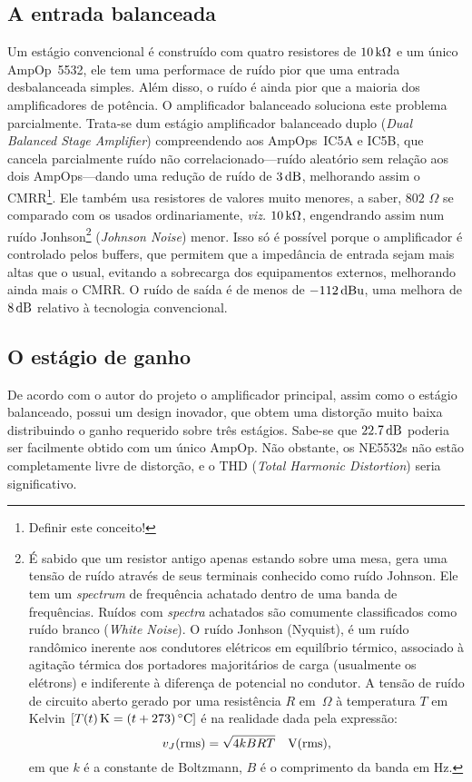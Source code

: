\documentclass[12pt, a4paper, leqno, twoside]{book}
\def\ohm{\,\Omega}
\def\ampop{AmpOp}
\def\db{{\rm dB}}
\begin{document}
  \subsection{A entrada balanceada}
  Um est\'agio convencional \'e constru\'ido com quatro resistores de $10\,{\rm k}\Omega$ e um \'unico \ampop\ 5532, ele tem uma performace de ru\'ido pior que uma entrada desbalanceada simples. Al\'em disso, o ru\'ido \'e ainda pior que a maioria dos amplificadores de pot\^encia. O amplificador balanceado soluciona este problema parcialmente. Trata-se dum est\'agio amplificador balanceado duplo ({\it Dual Balanced Stage Amplifier}) compreendendo aos \ampop{s}\ IC5A e IC5B, que cancela parcialmente ru\'ido n\~ao correlacionado---ru\'ido aleat\'orio sem rela\c c\~ao aos dois \ampop{s}---dando uma redu\c c\~ao de ru\'ido de $3\,\db$, melhorando assim o CMRR\footnote{Definir este conceito!}. Ele tamb\'em usa resistores de valores muito menores, a saber, $802\,\ohm$ se comparado com os usados ordinariamente, {\it viz.} $10\,{\rm k}\Omega$, engendrando assim num ru\'ido Jonhson\footnote{\'E sabido que um resistor antigo apenas estando sobre uma mesa, gera uma tens\~ao de ru\'ido atrav\'es de seus terminais conhecido como ru\'ido Johnson. Ele tem um {\it spectrum} de frequ\^encia achatado dentro de uma banda de frequ\^encias. Ru\'idos com {\it spectra} achatados s\~ao comumente classificados como ru\'ido branco ({\it White Noise}\/). O ru\'ido Jonhson (Nyquist), \'e um ru\'ido rand\^omico inerente aos condutores el\'etricos em equil\'ibrio t\'ermico, associado \`a agita\c c\~ao t\'ermica dos portadores majorit\'arios de carga (usualmente os el\'etrons) e indiferente \`a diferen\c ca de potencial no condutor. A tens\~ao de ru\'ido de circuito aberto gerado por uma resist\^encia $R$ em $\ohm$ \`a temperatura $T$ em Kelvin $[T(t)\,{\rm K}=(t+273)\,^\circ{\rm C}]$ \'e na realidade dada pela express\~ao:
    $$
      v_{J}({\rm rms})=\sqrt{4kBRT}\quad{\rm V(rms)},
    $$
    em que $k$ \'e a constante de Boltzmann, $B$ \'e o comprimento da banda em Hz.
  } ({\it Johnson Noise}) menor. Isso s\'o \'e poss\'ivel porque o amplificador \'e controlado pelos buffers, que permitem que a imped\^ancia de entrada sejam mais altas que o usual, evitando a sobrecarga dos equipamentos externos, melhorando ainda mais o CMRR. O ru\'ido de sa\'ida \'e de menos de $-112\,\db{\rm u}$, uma melhora de $8\,\db$ relativo \`a tecnologia convencional.
  \subsection{O est\'agio de ganho}
  De acordo com o autor do projeto o amplificador principal, assim como o est\'agio balanceado, possui um design inovador, que obtem uma distor\c c\~ao muito baixa distribuindo o ganho requerido sobre tr\^es est\'agios. Sabe-se que $22.7\,\db$ poderia ser facilmente obtido com um \'unico \ampop. N\~ao obstante, os NE5532s n\~ao est\~ao completamente livre de distor\c c\~ao, e o THD ({\it Total Harmonic Distortion}\/) seria significativo.
\end{document}
